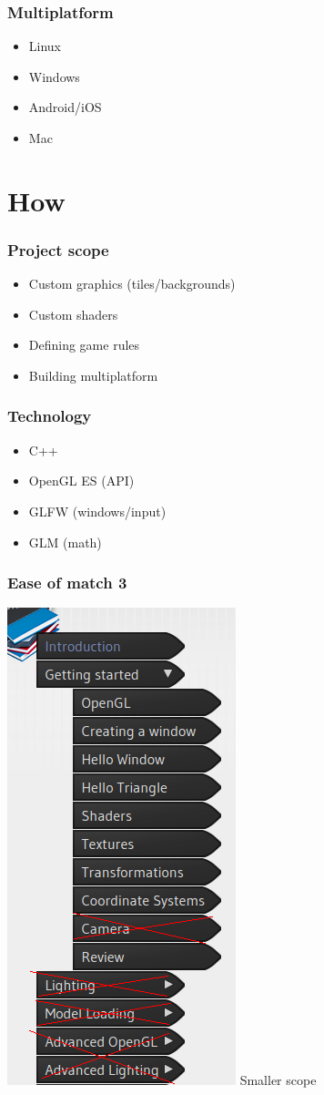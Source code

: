 \documentclass{beamer}
\begin{document}
    \begin{frame}
        \frametitle{Multiplatform}
        \begin{itemize}
            \item Linux
            \item Windows
            \item Android/iOS
            \item Mac
        \end{itemize}
        \end{frame}

    \section{How}
    \begin{frame}
    \frametitle{Project scope}
    \begin{itemize}
        \item Custom graphics (tiles/backgrounds)
        \item Custom shaders
        \item Defining game rules
        \item Building multiplatform
    \end{itemize}
    \end{frame}
    \begin{frame}
    \frametitle{Technology}
    \begin{itemize}
        \item C++
        \item OpenGL ES (API)
        \item GLFW (windows/input)
        \item GLM (math)
    \end{itemize}
    \end{frame}

    \begin{frame}
        \frametitle{Ease of match 3}
        \includegraphics[height=0.6\textwidth]{easy}
        Smaller scope
    \end{frame}
\end{document}
